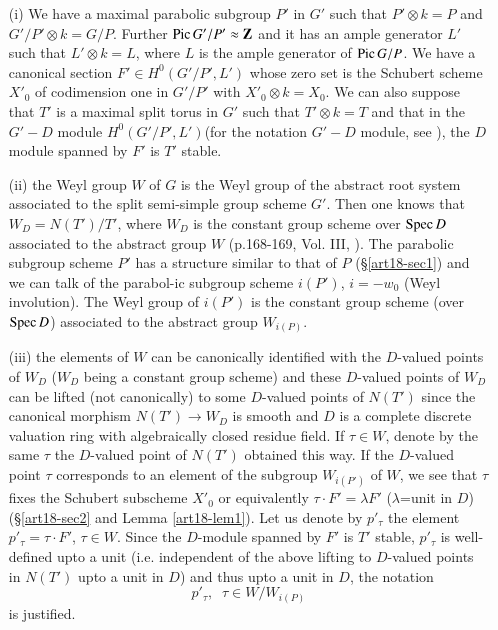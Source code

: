 \begin{itemize}
\item[(i)] We have a maximal parabolic subgroup $P'$ in $G'$ such that $P'\otimes k = P$ and $G'/P'\otimes k = G/P$. Further $\operatorname{Pic} G'/P' \approx \mathbf{Z}$ and it has an ample generator $L'$ such that $L'\otimes k= L$, where $L$ is the ample generator of $\operatorname{Pic} G/P$. We have a canonical section $F' \in H^0(G'/P',L')$ whose zero set is the Schubert scheme $X'_0$ of codimension one in  $G'/P'$ with $X'_0 \otimes k = X_0$. We can also suppose that $T'$ is a maximal split torus in $G'$ such that $T' \otimes k = T$ and that in the $G'-D$ module $H^0(G'/P',L')$\pageoriginale (for the notation $G'-D$ module, see \cite{art18-key15}), the $D$ module spanned by $F'$ is $T'$ stable.

\item[(ii)] the Weyl group $W$ of $G$ is the Weyl group of the abstract root system associated to the split semi-simple group scheme $G'$. Then one knows that $W_D = N (T') / T'$, where $W_D$ is the constant group scheme over $\operatorname{Spec} D$ associated to the abstract group $W$  (\cf p.168-169, Vol. III, \cite{art18-key15}). The parabolic subgroup scheme $P'$ has a structure similar to that of $P$ (\cf \S \ref{art18-sec1}) and we can talk of the parabol-ic subgroup scheme $i(P')$, $i = - w_0$ (Weyl involution). The Weyl group of $i(P')$  is the constant group scheme (over $\operatorname{Spec} D$) associated to the abstract group $W_{i(P)}$.

\item[(iii)] the elements of $W$ can be canonically identified with the $D$-valued points of $W_D$ ($W_D$ being a constant group scheme) and these $D$-valued points of $W_D$ can be lifted (not canonically) to some $D$-valued points of $N(T')$ since the canonical morphism $N(T') \to W_D$ is smooth and $D$ is a complete discrete valuation ring with algebraically closed residue field. If $\tau \in W$, denote by the same $\tau$ the $D$-valued point of $N(T')$ obtained this way. If the $D$-valued point $\tau$ corresponds to an  element of the subgroup $W_{i(P')}$ of $W$, we  see that $\tau$ fixes the Schubert subscheme $X'_0$ or equivalently $\tau \cdot F' = \lambda F'$ ($\lambda$=unit in $D$) (\cf \S \ref{art18-sec2} and Lemma \ref{art18-lem1}). Let us denote by $p'_\tau$ the element $p'_\tau = \tau \cdot F'$, $\tau \in W$. Since the $D$-module spanned by $F'$ is $T'$ stable, $p'_\tau$ is well-defined upto a unit  (i.e. independent of the above lifting to $D$-valued points in $N(T')$ upto a unit in $D$) and thus upto a unit in $D$, the notation
$$
p'_\tau, \;\; \tau \in W/ W_{i(P)}
$$
is justified.
\end{itemize}

